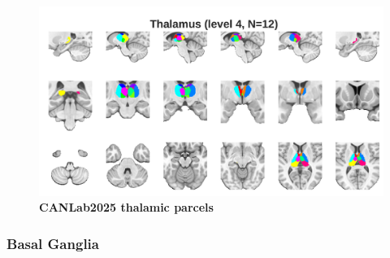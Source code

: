 \documentclass[10pt,letterpaper]{article}
\begin{document}
\begin{figure}[t]
\begin{minipage}{\linewidth}
\end{minipage}
\begin{minipage}{\linewidth}
\includegraphics[width=\linewidth]{images/thal_coarsest.png}
\end{minipage}
\caption{
{\bf
CANLab2025 thalamic parcels} 
}
\label{thalamus-granularities-figure}
\end{figure}

\subsubsection{Basal Ganglia}
\end{document}
